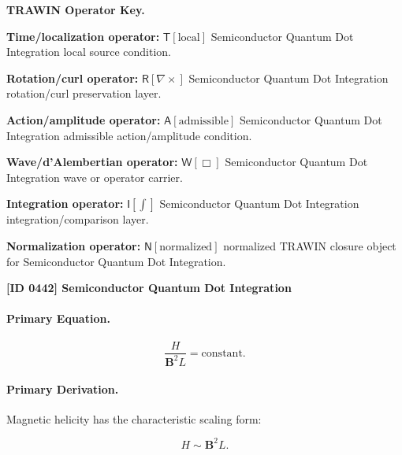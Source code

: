 \par\vspace{0.45\baselineskip}
\noindent\begin{minipage}[t]{\linewidth}
\begingroup
\small
\raggedright
\textbf{TRAWIN Operator Key.}\par
\noindent\textbf{Time/localization operator:} $\mathsf{T}\!\left[\mathrm{local}\right]$ Semiconductor Quantum Dot Integration local source condition.\par
\noindent\textbf{Rotation/curl operator:} $\mathsf{R}\!\left[\nabla\times\right]$ Semiconductor Quantum Dot Integration rotation/curl preservation layer.\par
\noindent\textbf{Action/amplitude operator:} $\mathsf{A}\!\left[\mathrm{admissible}\right]$ Semiconductor Quantum Dot Integration admissible action/amplitude condition.\par
\noindent\textbf{Wave/d'Alembertian operator:} $\mathsf{W}\!\left[\Box\right]$ Semiconductor Quantum Dot Integration wave or operator carrier.\par
\noindent\textbf{Integration operator:} $\mathsf{I}\!\left[\int\right]$ Semiconductor Quantum Dot Integration integration/comparison layer.\par
\noindent\textbf{Normalization operator:} $\mathsf{N}\!\left[\mathrm{normalized}\right]$ normalized TRAWIN closure object for Semiconductor Quantum Dot Integration.\par
\endgroup
\end{minipage}

\clearpage
\noindent\textbf{[ID 0442] Semiconductor Quantum Dot Integration}\par
\vspace{0.35em}
\paragraph{Primary Equation.}
\begin{equation}
\frac{H}{\mathbf{B}^2 L}
=
\mathrm{constant}.
\end{equation}

\paragraph{Primary Derivation.}
Magnetic helicity has the characteristic scaling form:

\begin{equation}
H
\sim
\mathbf{B}^2 L .
\end{equation}

